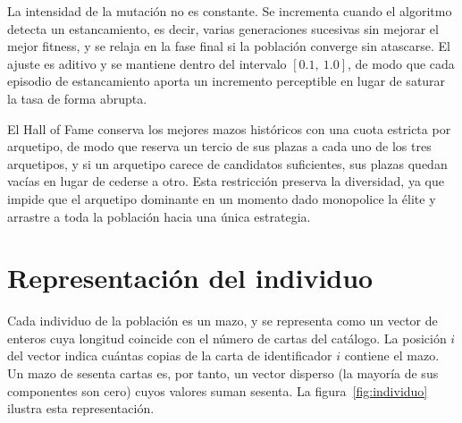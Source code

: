 La intensidad de la mutación no es constante. Se incrementa cuando el algoritmo detecta un estancamiento, es decir, varias generaciones sucesivas sin mejorar el mejor fitness, y se relaja en la fase final si la población converge sin atascarse. El ajuste es aditivo y se mantiene dentro del intervalo $[0.1,\ 1.0]$, de modo que cada episodio de estancamiento aporta un incremento perceptible en lugar de saturar la tasa de forma abrupta.

El Hall of Fame conserva los mejores mazos históricos con una cuota estricta por arquetipo, de modo que reserva un tercio de sus plazas a cada uno de los tres arquetipos, y si un arquetipo carece de candidatos suficientes, sus plazas quedan vacías en lugar de cederse a otro. Esta restricción preserva la diversidad, ya que impide que el arquetipo dominante en un momento dado monopolice la élite y arrastre a toda la población hacia una única estrategia.

\section{Representación del individuo}
\label{sec:representacion}

Cada individuo de la población es un mazo, y se representa como un vector de enteros cuya longitud coincide con el número de cartas del catálogo. La posición $i$ del vector indica cuántas copias de la carta de identificador $i$ contiene el mazo. Un mazo de sesenta cartas es, por tanto, un vector disperso (la mayoría de sus componentes son cero) cuyos valores suman sesenta. La figura~\ref{fig:individuo} ilustra esta representación.


